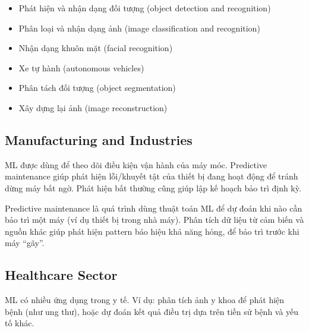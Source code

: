 \begin{phuongphap}[title={Một số tác vụ}]
\begin{itemize}
  \item Phát hiện và nhận dạng đối tượng (object detection and recognition)
  \item Phân loại và nhận dạng ảnh (image classification and recognition)
  \item Nhận dạng khuôn mặt (facial recognition)
  \item Xe tự hành (autonomous vehicles)
  \item Phân tách đối tượng (object segmentation)
  \item Xây dựng lại ảnh (image reconstruction)
\end{itemize}
\end{phuongphap}

\subsection{Manufacturing and Industries}

\begin{dongco}[title={Bảo trì dự đoán (predictive maintenance)}]
ML được dùng để theo dõi điều kiện vận hành của máy móc.
Predictive maintenance giúp phát hiện lỗi/khuyết tật của thiết bị đang hoạt động để tránh dừng máy bất ngờ.
Phát hiện bất thường cũng giúp lập kế hoạch bảo trì định kỳ.
\end{dongco}

\begin{ynghia}[title={Predictive maintenance là gì?}]
Predictive maintenance là quá trình dùng thuật toán ML để dự đoán khi nào cần bảo trì một máy (ví dụ thiết bị trong nhà máy).
Phân tích dữ liệu từ cảm biến và nguồn khác giúp phát hiện pattern báo hiệu khả năng hỏng, để bảo trì trước khi máy “gãy”.
\end{ynghia}

\subsection{Healthcare Sector}

\begin{dongco}[title={ML trong y tế}]
ML có nhiều ứng dụng trong y tế.
Ví dụ: phân tích ảnh y khoa để phát hiện bệnh (như ung thư), hoặc dự đoán kết quả điều trị dựa trên tiền sử bệnh và yếu tố khác.
\end{dongco}

